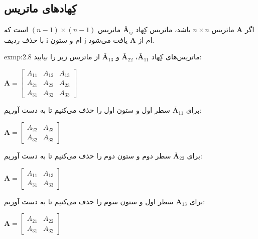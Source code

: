 \subsection{\textbf{کِهاد‌های ماتریس}}
\label{subsec:2.5.1}
{
    \Large
    \begin{spacing}{1.3}
        اگر $\textbf{A}$ ماتریس $n\times n$ باشد، ماتریس کِهاد $\bar{\textbf{A}}_{ij}$ ماتریس $(n-1)\times (n-1)$ است که با حذف ردیف i ام و ستون j ام از $\textbf{A}$ یافت می‌شود.

        \begin{exmp}{exmp:2.8}
            \Large
            ماتریس‌های کِهاد $\bar{\textbf{A}}_{11}$، $\bar{\textbf{A}}_{22}$ و $\bar{\textbf{A}}_{13}$ از ماتریس زیر را بیابید:

            \begin{center}
                $\textbf{A}=\begin{bmatrix}
                                A_{11} & A_{12} & A_{13} \\
                                A_{21} & A_{22} & A_{23} \\
                                A_{31} & A_{32} & A_{33}
                \end{bmatrix}$
            \end{center}

            برای $\bar{\textbf{A}}_{11}$ سطر اول و ستون اول را حذف می‌کنیم تا به دست آوریم:

            \begin{center}
                $\textbf{A}=\begin{bmatrix}
                                A_{22} & A_{23} \\
                                A_{32} & A_{33}
                \end{bmatrix}$
            \end{center}

            برای $\bar{\textbf{A}}_{22}$ سطر دوم و ستون دوم را حذف می‌کنیم تا به دست آوریم:

            \begin{center}
                $\textbf{A}=\begin{bmatrix}
                                A_{11} & A_{13} \\
                                A_{31} & A_{33}
                \end{bmatrix}$
            \end{center}

            برای $\bar{\textbf{A}}_{13}$ سطر اول و ستون سوم را حذف می‌کنیم تا به دست آوریم:

            \begin{center}
                $\textbf{A}=\begin{bmatrix}
                                A_{21} & A_{22} \\
                                A_{31} & A_{32}
                \end{bmatrix}$
            \end{center}
        \end{exmp}
    \end{spacing}
}

